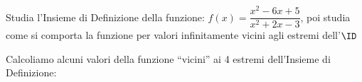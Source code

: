 \begin{esempio}
 Studia l'Insieme di Definizione della funzione: 
 \(f(x)=\dfrac{x^2-6x+5}{x^2+2x-3}\),\quad
poi studia come si comporta la funzione per valori infinitamente vicini 
agli estremi dell'\(\ID\)


Calcoliamo alcuni valori della funzione ``vicini'' ai 4 estremi 
dell'Insieme di Definizione:


\end{esempio}
